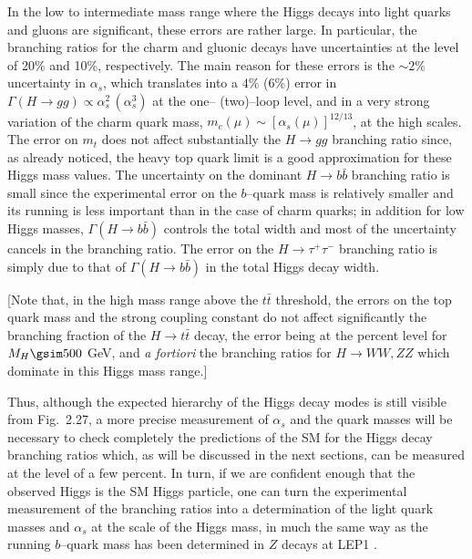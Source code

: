 In the low to intermediate mass range where the Higgs decays into light quarks
and gluons are significant, these errors are rather large. In particular, the
branching ratios for the charm and gluonic decays have uncertainties at the
level of 20\% and 10\%, respectively. The main reason for these errors is
the $\sim 2\%$ uncertainty in $\alpha_s$, which translates into a $4\%$ ($6\%$)
error in $\Gamma(H \to gg) \propto \alpha_s^2 \, (\alpha_s^3)$ at the one--
(two)--loop level, and in a very strong variation of the charm quark mass, 
$m_c(\mu)
\sim [\alpha_s(\mu)]^{12/13}$, at the high scales. The error on $m_t$ does
not affect substantially the $H \to gg$ branching ratio since, as already
noticed, the heavy top  quark limit is a good approximation for these Higgs
mass values.  The uncertainty on the dominant $H \to b\bar{b}$ branching ratio
is small since the experimental error on the $b$--quark mass is relatively
smaller and its running is less important than in the case of charm quarks; in
addition for low Higgs masses, $\Gamma(H \to b\bar{b})$ controls the total
width and most of the uncertainty cancels in the branching ratio. The error on
the $H\to \tau^+ \tau^-$ branching ratio is simply due to that of $\Gamma(H \to
b\bar{b})$ in the total Higgs decay width.\s 

[Note that, in the high mass range above the $t\bar{t}$ threshold, the errors
on the top quark mass and the strong coupling constant do not affect
significantly the branching fraction of the $H\to t\bar{t}$ decay, the error
being at the percent level for $M_H \gsim 500$ GeV, and {\it a fortiori} the
branching ratios for $H \to WW,ZZ$ which dominate in this Higgs mass range.]\s

Thus, although the expected hierarchy of the Higgs decay modes is still visible
from Fig.~2.27, a more precise measurement of $\alpha_s$ and the quark masses 
will be necessary to check completely the predictions of the SM for the Higgs
decay branching ratios which, as will be discussed in the next sections, can be 
measured at the level of a few percent. In turn, if we are confident enough 
that the observed Higgs is the SM Higgs particle, one can turn the experimental
measurement of the branching ratios into a determination of the light quark
masses and $\alpha_s$ at the scale of the Higgs mass, in much the same 
way as the running $b$--quark mass has been determined in $Z$ decays at
LEP1 \cite{Narison}.  

\begin{figure}[!h]
\begin{center}
\vspace*{-3.cm}
\hspace*{-2cm}
\end{center}
\vspace*{-15.5cm}
\end{figure}


\newpage
